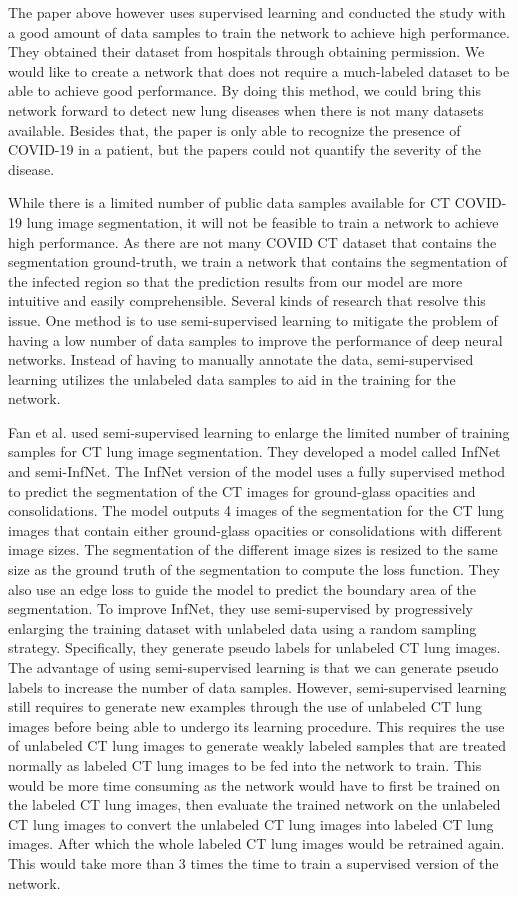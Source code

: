 The paper above however uses supervised learning and conducted the study with a good amount of data samples to train the network to achieve high performance. They obtained their dataset from hospitals through obtaining permission. We would like to create a network that does not require a much-labeled dataset to be able to achieve good performance. By doing this method, we could bring this network forward to detect new lung diseases when there is not many datasets available. Besides that, the paper is only able to recognize the presence of COVID-19 in a patient, but the papers could not quantify the severity of the disease. 

While there is a limited number of public data samples available for CT COVID-19 lung image segmentation, it will not be feasible to train a network to achieve high performance. As there are not many COVID CT dataset that contains the segmentation ground-truth, we train a network that contains the segmentation of the infected region so that the prediction results from our model are more intuitive and easily comprehensible. Several kinds of research that resolve this issue. One method is to use semi-supervised learning to mitigate the problem of having a low number of data samples to improve the performance of deep neural networks. Instead of having to manually annotate the data, semi-supervised learning utilizes the unlabeled data samples to aid in the training for the network.

Fan et al. \cite{ref2} used semi-supervised learning to enlarge the limited number of training samples for CT lung image segmentation. They developed a model called InfNet and semi-InfNet. The InfNet version of the model uses a fully supervised method to predict the segmentation of the CT images for ground-glass opacities and consolidations. The model outputs 4 images of the segmentation for the CT lung images that contain either ground-glass opacities or consolidations with different image sizes. The segmentation of the different image sizes is resized to the same size as the ground truth of the segmentation to compute the loss function. They also use an edge loss to guide the model to predict the boundary area of the segmentation. To improve InfNet, they use semi-supervised by progressively enlarging the training dataset with unlabeled data using a random sampling strategy. Specifically, they generate pseudo labels for unlabeled CT lung images. The advantage of using semi-supervised learning is that we can generate pseudo labels to increase the number of data samples. However, semi-supervised learning still requires to generate new examples through the use of unlabeled CT lung images before being able to undergo its learning procedure. This requires the use of unlabeled CT lung images to generate weakly labeled samples that are treated normally as labeled CT lung images to be fed into the network to train. This would be more time consuming as the network would have to first be trained on the labeled CT lung images, then evaluate the trained network on the unlabeled CT lung images to convert the unlabeled CT lung images into labeled CT lung images. After which the whole labeled CT lung images would be retrained again. This would take more than 3 times the time to train a supervised version of the network.

